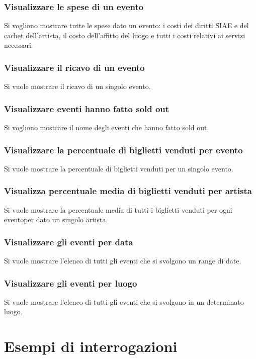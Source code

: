 \documentclass[a4paper,11pt]{article}
\begin{document}
\subsubsection{Visualizzare le spese di un evento}
Si vogliono mostrare tutte le spese dato un evento: i costi dei diritti SIAE e del
cachet dell'artista, il costo dell'affitto del luogo e tutti i costi relativi ai
servizi necessari.


\subsubsection{Visualizzare il ricavo di un evento}
Si vuole mostrare il ricavo di un singolo evento.


\subsubsection{Visualizzare eventi hanno fatto sold out}
Si vogliono mostrare il nome degli eventi che hanno fatto sold out.


\subsubsection{Visualizzare la percentuale di biglietti venduti per evento}
Si vuole mostrare la percentuale di biglietti venduti per un singolo evento.


\subsubsection{Visualizza percentuale media di biglietti venduti per artista}
Si vuole mostrare la percentuale media di tutti i biglietti venduti per ogni
eventoper dato un singolo artista.

 
\subsubsection{Visualizzare gli eventi per data}
Si vuole mostrare l'elenco di tutti gli eventi che si svolgono un range di date.


\subsubsection{Visualizzare gli eventi per luogo}
Si vuole mostrare l'elenco di tutti gli eventi che si svolgono in un determinato luogo.


\section{Esempi di interrogazioni}
\end{document}
